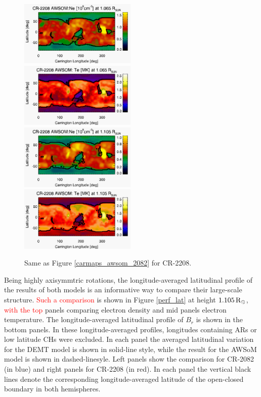 \documentclass[namedreferences]{solarphysics}
\def\edit#1{\textcolor{Red}{#1}}
\newcommand{\mrsun}{{\rm R_\odot}}
\begin{document}
\begin{article}
\begin{figure}[h!]
\begin{center}
\includegraphics[width=0.495\textwidth]{figs/map_Ne_awsom_2208_185_short_1065_Rsun.pdf}
\includegraphics[width=0.495\textwidth]{figs/map_Te_awsom_2208_185_short_1065_Rsun.pdf}
\includegraphics[width=0.495\textwidth]{figs/map_Ne_awsom_2208_185_short_1105_Rsun.pdf}
\includegraphics[width=0.495\textwidth]{figs/map_Te_awsom_2208_185_short_1105_Rsun.pdf}
\caption{Same as Figure \ref{carmaps_awsom_2082} for CR-2208.}
\label{carmaps_awsom_2208}
\end{center}
\end{figure}



{Being highly axisymmtric rotations, the longitude-averaged latitudinal {profile} of the results of both models is an informative way to compare their large-scale structure. \edit{Such a comparison} is shown in Figure \ref{perf_lat} at height $1.105\,\mrsun$, \edit{with the top} panels comparing electron density and mid panels electron temperature. {The longitude-averaged latitudinal profile of $B_r$ is shown in the bottom panels.} In these longitude-averaged profiles, longitudes containing ARs or low latitude CHs were excluded. In each panel the averaged latitudinal variation for the DEMT model is shown in solid-line style, while the result for the AWSoM model is shown in dashed-linesyle. Left panels show the comparison for CR-2082 (in blue) and right panels for CR-2208 (in red). In each panel the vertical black lines denote the corresponding longitude-averaged latitude of the open-closed boundary in both hemispheres.}


\end{article}
\end{document}
